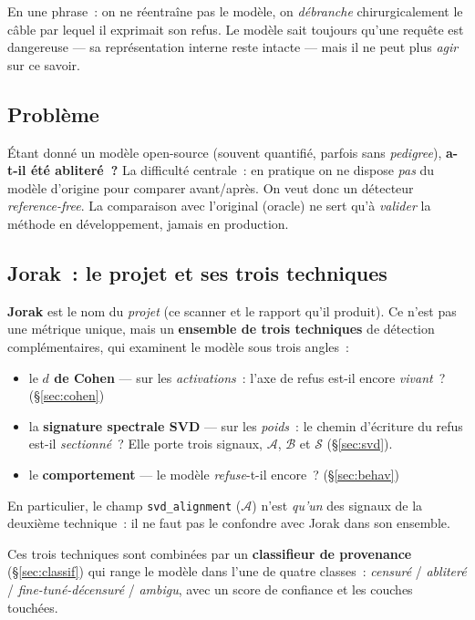 \documentclass[11pt,a4paper]{article}
\theoremstyle{definition}
\theoremstyle{plain}
\begin{document}
En une phrase~: on ne réentraîne pas le modèle, on \emph{débranche} chirurgicalement
le câble par lequel il exprimait son refus. Le modèle \og sait\fg{} toujours qu'une
requête est dangereuse — sa représentation interne reste intacte — mais il ne peut
plus \emph{agir} sur ce savoir.

\subsection{Problème}
Étant donné un modèle open-source (souvent quantifié, parfois sans \emph{pedigree}),
\textbf{a-t-il été abliteré~?} La difficulté centrale~: en pratique on ne dispose
\emph{pas} du modèle d'origine pour comparer \og avant/après\fg{}. On veut donc un
détecteur \emph{reference-free}. La comparaison avec l'original (\og oracle\fg{}) ne
sert qu'à \emph{valider} la méthode en développement, jamais en production.

\subsection{Jorak~: le projet et ses trois techniques}
\begin{intuition}[Jorak = le projet, pas une métrique]
\textbf{Jorak} est le nom du \emph{projet} (ce scanner et le rapport qu'il produit).
Ce n'est pas une métrique unique, mais un \textbf{ensemble de trois techniques}
de détection complémentaires, qui examinent le modèle sous trois angles~:
\begin{itemize}\itemsep1pt
  \item le \textbf{$d$ de Cohen} — sur les \emph{activations}~: l'axe de refus
  est-il encore \emph{vivant}~? (\S\ref{sec:cohen})
  \item la \textbf{signature spectrale SVD} — sur les \emph{poids}~: le chemin
  d'écriture du refus est-il \emph{sectionné}~? Elle porte trois signaux,
  $\mathcal{A}$, $\mathcal{B}$ et $\mathcal{S}$ (\S\ref{sec:svd}).
  \item le \textbf{comportement} — le modèle \emph{refuse}-t-il encore~?
  (\S\ref{sec:behav})
\end{itemize}
En particulier, le champ \texttt{svd\_alignment} ($\mathcal{A}$) n'est \emph{qu'un}
des signaux de la deuxième technique~: il ne faut pas le confondre avec \og Jorak\fg{}
dans son ensemble.
\end{intuition}

\noindent Ces trois techniques sont combinées par un \textbf{classifieur de
provenance} (\S\ref{sec:classif}) qui range le modèle dans l'une de quatre classes~:
\emph{censuré} / \emph{abliteré} / \emph{fine-tuné-décensuré} / \emph{ambigu}, avec
un score de confiance et les couches touchées.
\end{document}
